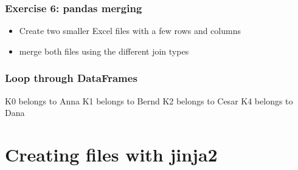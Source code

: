 \documentclass[english]{beamer}
\begin{document}
\begin{frame}
\frametitle{Exercise 6: pandas merging}

\begin{itemize}
\item Create two smaller Excel files with a few rows and columns
\item merge both files using the different join types
\end{itemize}
\end{frame}

\begin{frame}[containsverbatim]
\frametitle{Loop through DataFrames}



\begin{ausgabe}
K0 belongs to Anna
K1 belongs to Bernd
K2 belongs to Cesar
K4 belongs to Dana
\end{ausgabe}
\end{frame}



%
%
%

\section{Creating files with jinja2}
\end{document}
